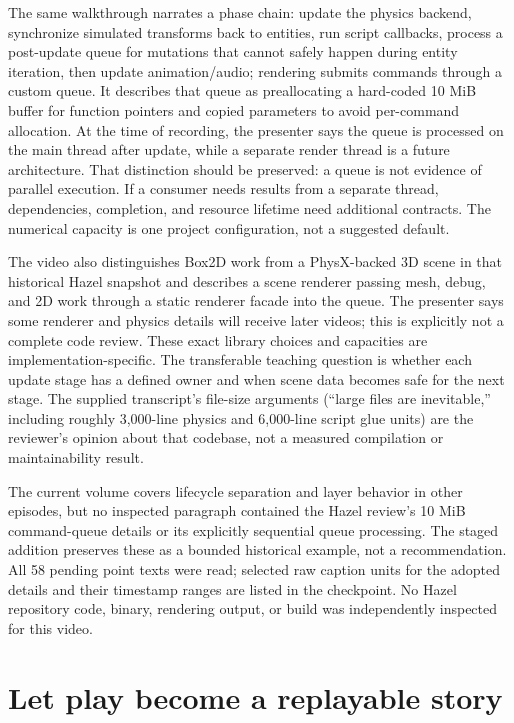 The same walkthrough narrates a phase chain: update the physics backend, synchronize simulated transforms back to entities, run script callbacks, process a post-update queue for mutations that cannot safely happen during entity iteration, then update animation/audio; rendering submits commands through a custom queue. It describes that queue as preallocating a hard-coded 10 MiB buffer for function pointers and copied parameters to avoid per-command allocation. At the time of recording, the presenter says the queue is processed on the main thread after update, while a separate render thread is a future architecture. That distinction should be preserved: a queue is not evidence of parallel execution. If a consumer needs results from a separate thread, dependencies, completion, and resource lifetime need additional contracts. The numerical capacity is one project configuration, not a suggested default.

The video also distinguishes Box2D work from a PhysX-backed 3D scene in that historical Hazel snapshot and describes a scene renderer passing mesh, debug, and 2D work through a static renderer facade into the queue. The presenter says some renderer and physics details will receive later videos; this is explicitly not a complete code review. These exact library choices and capacities are implementation-specific. The transferable teaching question is whether each update stage has a defined owner and when scene data becomes safe for the next stage. The supplied transcript's file-size arguments (``large files are inevitable,'' including roughly 3,000-line physics and 6,000-line script glue units) are the reviewer's opinion about that codebase, not a measured compilation or maintainability result.

The current volume covers lifecycle separation and layer behavior in other episodes, but no inspected paragraph contained the Hazel review's 10 MiB command-queue details or its explicitly sequential queue processing. The staged addition preserves these as a bounded historical example, not a recommendation. All 58 pending point texts were read; selected raw caption units for the adopted details and their timestamp ranges are listed in the checkpoint. No Hazel repository code, binary, rendering output, or build was independently inspected for this video.

\section{Let play become a replayable story}\label{06-engine-ii-ch046-let-play-become-a-replayable-story}

